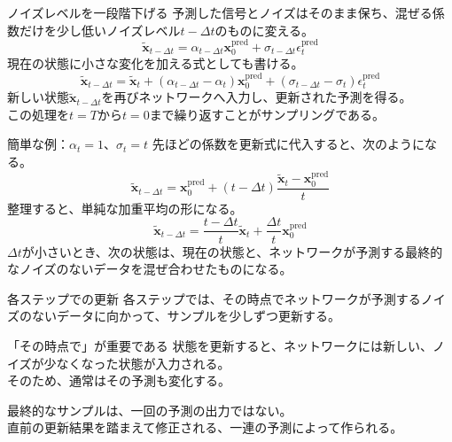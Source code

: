 \begin{frame}{ノイズレベルを一段階下げる}
    予測した信号とノイズはそのまま保ち、混ぜる係数だけを少し低いノイズレベル\(t-\Delta t\)のものに変える。
    \[
        \tilde{\boldsymbol{x}}_{t-\Delta t}=\alpha_{t-\Delta t}\boldsymbol{x}_{0}^{\mathrm{pred}}+\sigma_{t-\Delta t}\epsilon_{t}^{\mathrm{pred}}
    \]
    現在の状態に小さな変化を加える式としても書ける。
    \[
        \tilde{\boldsymbol{x}}_{t-\Delta t}
        =\tilde{\boldsymbol{x}}_{t}
        +(\alpha_{t-\Delta t}-\alpha_{t})\boldsymbol{x}_{0}^{\mathrm{pred}}
        +(\sigma_{t-\Delta t}-\sigma_{t})\epsilon_{t}^{\mathrm{pred}}
        \tag{1.4.1}
    \]
    新しい状態\(\tilde{\boldsymbol{x}}_{t-\Delta t}\)を再びネットワークへ入力し、更新された予測を得る。\\
    この処理を\(t=T\)から\(t=0\)まで繰り返すことがサンプリングである。
\end{frame}
\begin{frame}{簡単な例：\(\alpha_{t}=1\)、\(\sigma_{t}=t\)}
    先ほどの係数を更新式に代入すると、次のようになる。
    \[
        \tilde{\boldsymbol{x}}_{t-\Delta t}
        =\boldsymbol{x}_{0}^{\mathrm{pred}}
        +(t-\Delta t)\frac{\tilde{\boldsymbol{x}}_{t}-\boldsymbol{x}_{0}^{\mathrm{pred}}}{t}
    \]
    整理すると、単純な加重平均の形になる。
    \[
        \tilde{\boldsymbol{x}}_{t-\Delta t}
        =\frac{t-\Delta t}{t}\tilde{\boldsymbol{x}}_{t}
        +\frac{\Delta t}{t}\boldsymbol{x}_{0}^{\mathrm{pred}}
    \]
    \(\Delta t\)が小さいとき、次の状態は、現在の状態と、ネットワークが予測する最終的なノイズのないデータを混ぜ合わせたものになる。
\end{frame}
\begin{frame}{各ステップでの更新}
    各ステップでは、その時点でネットワークが予測するノイズのないデータに向かって、サンプルを少しずつ更新する。
    \vspace{0.8em}
    \begin{alertblock}{「その時点で」が重要である}
        状態を更新すると、ネットワークには新しい、ノイズが少なくなった状態が入力される。\\
        そのため、通常はその予測も変化する。
    \end{alertblock}
    \vspace{0.5em}
    最終的なサンプルは、一回の予測の出力ではない。\\
    直前の更新結果を踏まえて修正される、一連の予測によって作られる。
\end{frame}

